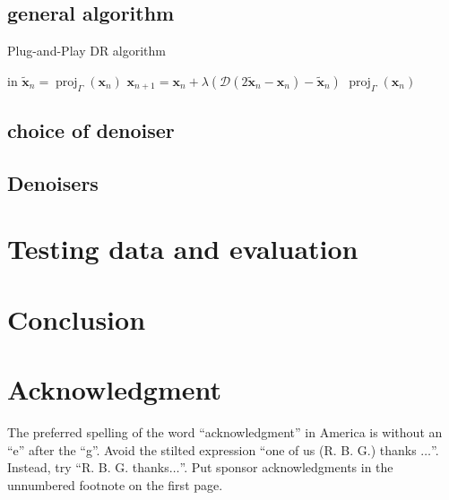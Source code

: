 \documentclass[conference]{IEEEtran}
\begin{document}
\subsection{general algorithm}

\begin{algorithm}
	\caption{Plug-and-Play DR algorithm}
	\begin{algorithmic}[1]
		\renewcommand{\algorithmicrequire}{\textbf{Input:}}
		\renewcommand{\algorithmicensure}{\textbf{Output:}}
		\REQUIRE in
		\STATE $\mathbf{\widetilde{x}}_n=\operatorname{proj}_{\Gamma}(\mathbf{x}_n) $ 
		\STATE $ \mathbf{x}_{n+1} = \mathbf{x}_n + \lambda \left( \mathcal{D} \left(2\mathbf{\widetilde{x}}_n-\mathbf{x}_n \right)-\mathbf{\widetilde{x}}_n\right)$
		\ENDFOR
		\RETURN $\operatorname{proj}_{\Gamma}(\mathbf{x}_n)$ 
	\end{algorithmic} 
\end{algorithm}
\subsection{choice of denoiser}

\subsection{Denoisers}

\section{Testing data and evaluation}\label{sec:eval}


\section{Conclusion}

\section*{Acknowledgment}

The preferred spelling of the word ``acknowledgment'' in America is without 
an ``e'' after the ``g''. Avoid the stilted expression ``one of us (R. B. 
G.) thanks $\ldots$''. Instead, try ``R. B. G. thanks$\ldots$''. Put sponsor 
acknowledgments in the unnumbered footnote on the first page.



\end{document}
